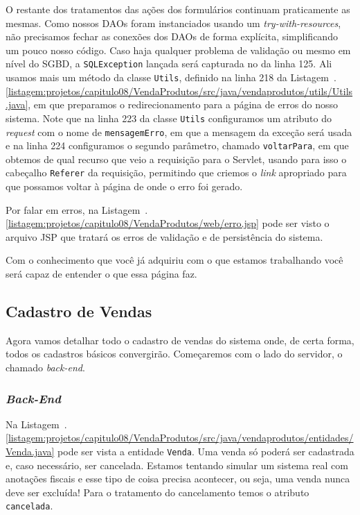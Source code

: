 O restante dos tratamentos das ações dos formulários continuam praticamente as mesmas. Como nossos DAOs foram instanciados usando um \textit{try-with-resources}, não precisamos fechar as conexões dos DAOs de forma explícita, simplificando um pouco nosso código. Caso haja qualquer problema de validação ou mesmo em nível do SGBD, a \texttt{SQLException} lançada será capturada no  da linha 125. Ali usamos mais um método da classe \texttt{Utils}, definido na linha 218 da Listagem~\thechapter.\ref{listagem:projetos/capitulo08/VendaProdutos/src/java/vendaprodutos/utils/Utils.java}, em que preparamos o redirecionamento para a página de erros do nosso sistema. Note que na linha 223 da classe \texttt{Utils} configuramos um atributo do \textit{request} com o nome de \texttt{mensagemErro}, em que a mensagem da exceção será usada e na linha 224 configuramos o segundo parâmetro, chamado \texttt{voltarPara}, em que obtemos de qual recurso que veio a requisição para o Servlet, usando para isso o cabeçalho \texttt{Referer} da requisição, permitindo que criemos o \textit{link} apropriado para que possamos voltar à página de onde o erro foi gerado.

Por falar em erros, na Listagem~\thechapter.\ref{listagem:projetos/capitulo08/VendaProdutos/web/erro.jsp} pode ser visto o arquivo JSP que tratará os erros de validação e de persistência do sistema.


Com o conhecimento que você já adquiriu com o que estamos trabalhando você será capaz de entender o que essa página faz.


\subsection{Cadastro de Vendas}

Agora vamos detalhar todo o cadastro de vendas do sistema onde, de certa forma, todos os cadastros básicos convergirão. Começaremos com o lado do servidor, o chamado \textit{back-end}.

\subsubsection{\textit{Back-End}}

Na Listagem~\thechapter.\ref{listagem:projetos/capitulo08/VendaProdutos/src/java/vendaprodutos/entidades/Venda.java} pode ser vista a entidade \texttt{Venda}. Uma venda só poderá ser cadastrada e, caso necessário, ser cancelada. Estamos tentando simular um sistema real com anotações fiscais e esse tipo de coisa precisa acontecer, ou seja, uma venda nunca deve ser excluída! Para o tratamento do cancelamento temos o atributo \texttt{cancelada}.

